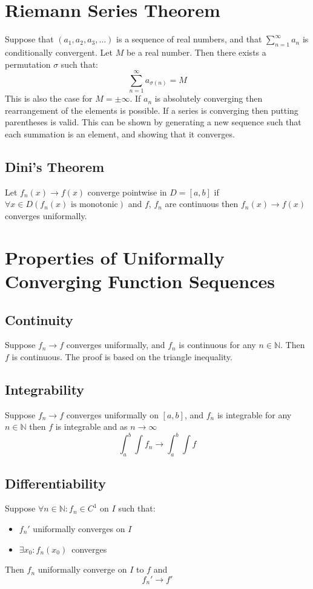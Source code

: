\documentclass{article}
\newcommand{\N}{\mathbb{N}}
\begin{document}
	\newpage
	
	\section{Riemann Series Theorem}
	Suppose that $(a_{1}, a_{2}, a_{3}, \ldots)$ is a sequence of real numbers, 
	and that $\sum_{n=1}^\infty{a_n}$ is conditionally convergent. 
	Let $M$ be a real number. Then there exists a permutation $\sigma$ such that:
	\[
		\sum_{n=1}^{\infty}a_{\sigma(n)}=M
	\] 
	This is also the case for $M = \pm \infty$.
	If $a_n$ is absolutely converging then rearrangement of the elements is possible.
	If a series is converging then putting parentheses is valid.
	This can be shown by generating a new sequence such that each summation is an element, 
	and showing that it converges.
	 	
	\subsection{Dini's Theorem}
	Let $f_n(x)\to f(x)$ converge pointwise in $D=[a,b]$ if 
	$\forall x \in D(f_n(x) \text{ is monotonic})$ and $f$, $f_n$ are continuous 
	then $f_n(x) \to f(x)$ converges uniformally.
	
	\newpage
	
	\section{Properties of Uniformally Converging Function Sequences}
		\subsection{Continuity}
			Suppose $f_n \to f$ converges uniformally, and $f_n$ is 
			continuous for any $n\in\N$. Then $f$ is continuous. 
			The proof is based on the triangle inequality.
	
		\subsection{Integrability}
			Suppose $f_n\to f$ converges uniformally on $[a,b]$, 
			and $f_n$ is integrable for any $n\in\N$ 
			then $f$ is integrable and as $n\to\infty$
			\[
				\int_a^b \int f_n\to\int_a^b \int f
			\]
			
		\subsection{Differentiability}
			Suppose $\forall n\in\N\colon f_n \in C^1$ on $I$ such that:
			\begin{itemize}
				\item  $f_n'$ uniformally converges on $I$
				\item $\exists x_0:f_n(x_0)\,$ converges
			\end{itemize}
			Then $f_n$ uniformally converge on $I$ to $f$ and
			\[
				f_n'\to f'
			\]
	
\end{document}
